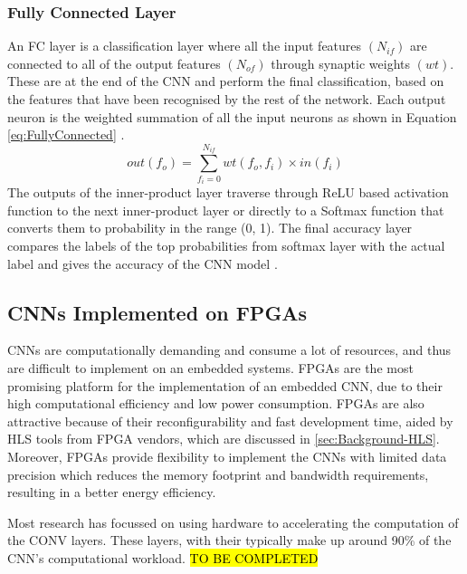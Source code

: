 \documentclass[12pt]{article}
\begin{document}
\subsubsection{Fully Connected Layer}
\label{sec:Background-CNN-FC}
\vspace{-12pt}

An FC layer is a classification layer where all the input features $(N_{if})$ are connected to all of the output features $(N_{of})$ through synaptic weights $(wt)$. These are at the end of the CNN and perform the final classification, based on the features that have been recognised by the rest of the network. Each output neuron is the weighted summation of all the input neurons as shown in Equation \ref{eq:FullyConnected} \cite{fpgaCnnAccelerator}.
\begin{equation}
out(f_o)=\sum^{N_{if}}_{f_i=0}wt(f_o,f_i)\times in(f_i)
\label{eq:FullyConnected}
\end{equation}
The outputs of the inner-product layer traverse through ReLU based activation function to the next inner-product layer or directly to a Softmax function that converts them to probability in the range (0, 1). The final accuracy layer compares the labels of the top probabilities from softmax layer with the actual label and gives the accuracy of the CNN model \cite{fpgaCnnAccelerator}.

\subsection{CNNs Implemented on FPGAs}
\label{sec:Background-CNNsImplementedOnFPGAs}
\vspace{-12pt}

CNNs are computationally demanding and consume a lot of resources, and thus are difficult to implement on an embedded systems. FPGAs are the most promising platform for the implementation of an embedded CNN, due to their high computational efficiency and low power consumption. FPGAs are also attractive because of their reconfigurability and fast development time, aided by HLS tools from FPGA vendors, which are discussed in \ref{sec:Background-HLS}. Moreover, FPGAs provide flexibility to implement the CNNs with limited data precision which reduces the memory footprint and bandwidth requirements, resulting in a better energy efficiency\cite{fpgaCnnAccelerator}.

Most research has focussed on using hardware to accelerating the computation of the CONV layers. These layers, with their  typically make up around 90\% of the CNN's computational workload. \hl{TO BE COMPLETED}
\end{document}
